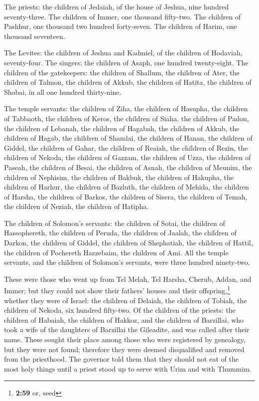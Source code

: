  The priests: the children of Jedaiah, of the house of
Jeshua, nine hundred seventy-three.  The children of
Immer, one thousand fifty-two.  The children of Pashhur,
one thousand two hundred forty-seven.  The children of
Harim, one thousand seventeen.

 The Levites: the children of Jeshua and Kadmiel, of the
children of Hodaviah, seventy-four.  The singers: the
children of Asaph, one hundred twenty-eight.  The
children of the gatekeepers: the children of Shallum, the children of
Ater, the children of Talmon, the children of Akkub, the children of
Hatita, the children of Shobai, in all one hundred thirty-nine.

 The temple servants: the children of Ziha, the children
of Hasupha, the children of Tabbaoth,  the children of
Keros, the children of Siaha, the children of Padon,  the
children of Lebanah, the children of Hagabah, the children of Akkub,
 the children of Hagab, the children of Shamlai, the
children of Hanan,  the children of Giddel, the children
of Gahar, the children of Reaiah,  the children of Rezin,
the children of Nekoda, the children of Gazzam,  the
children of Uzza, the children of Paseah, the children of Besai,
 the children of Asnah, the children of Meunim, the
children of Nephisim,  the children of Bakbuk, the
children of Hakupha, the children of Harhur,  the
children of Bazluth, the children of Mehida, the children of Harsha,
 the children of Barkos, the children of Sisera, the
children of Temah,  the children of Neziah, the children
of Hatipha.

 The children of Solomon's servants: the children of
Sotai, the children of Hassophereth, the children of Peruda,
 the children of Jaalah, the children of Darkon, the
children of Giddel,  the children of Shephatiah, the
children of Hattil, the children of Pochereth Hazzebaim, the children of
Ami.  All the temple servants, and the children of
Solomon's servants, were three hundred ninety-two.

 These were those who went up from Tel Melah, Tel Harsha,
Cherub, Addan, and Immer; but they could not show their fathers' houses
and their offspring,\footnote{\textbf{2:59} or, seed} whether they were
of Israel:  the children of Delaiah, the children of
Tobiah, the children of Nekoda, six hundred fifty-two. 
Of the children of the priests: the children of Habaiah, the children of
Hakkoz, and the children of Barzillai, who took a wife of the daughters
of Barzillai the Gileadite, and was called after their name.
 These sought their place among those who were registered
by genealogy, but they were not found; therefore they were deemed
disqualified and removed from the priesthood.  The
governor told them that they should not eat of the most holy things
until a priest stood up to serve with Urim and with Thummim.

